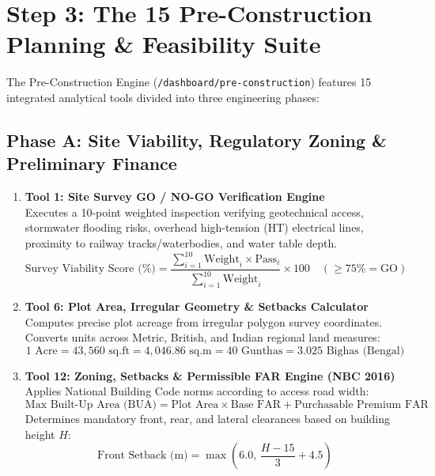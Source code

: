 \documentclass[11pt,a4paper]{article}
\begin{document}
\section{Step 3: The 15 Pre-Construction Planning \& Feasibility Suite}

The Pre-Construction Engine (\texttt{/dashboard/pre-construction}) features 15 integrated analytical tools divided into three engineering phases:

\subsection{Phase A: Site Viability, Regulatory Zoning \& Preliminary Finance}

\begin{enumerate}[leftmargin=*]
    \item \textbf{Tool 1: Site Survey GO / NO-GO Verification Engine} \\
    Executes a 10-point weighted inspection verifying geotechnical access, stormwater flooding risks, overhead high-tension (HT) electrical lines, proximity to railway tracks/waterbodies, and water table depth.
    \begin{equation}
        \text{Survey Viability Score (\%)} = \frac{\sum_{i=1}^{10} \text{Weight}_i \times \text{Pass}_i}{\sum_{i=1}^{10} \text{Weight}_i} \times 100 \quad (\ge 75\% = \text{GO})
    \end{equation}

    \item \textbf{Tool 6: Plot Area, Irregular Geometry \& Setbacks Calculator} \\
    Computes precise plot acreage from irregular polygon survey coordinates. Converts units across Metric, British, and Indian regional land measures:
    \begin{equation}
        1\text{ Acre} = 43,560\text{ sq.ft} = 4,046.86\text{ sq.m} = 40\text{ Gunthas} = 3.025\text{ Bighas (Bengal)}
    \end{equation}

    \item \textbf{Tool 12: Zoning, Setbacks \& Permissible FAR Engine (NBC 2016)} \\
    Applies National Building Code norms according to access road width:
    \begin{equation}
        \text{Max Built-Up Area (BUA)} = \text{Plot Area} \times \text{Base FAR} + \text{Purchasable Premium FAR}
    \end{equation}
    Determines mandatory front, rear, and lateral clearances based on building height $H$:
    \begin{equation}
        \text{Front Setback (m)} = \max\left(6.0,\, \frac{H - 15}{3} + 4.5\right)
    \end{equation}


\end{enumerate}
\end{document}
